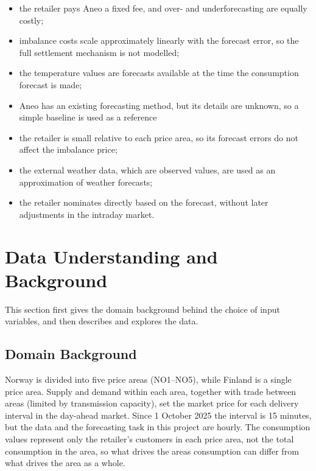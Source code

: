 \documentclass[11pt,a4paper]{article}
\begin{document}
\begin{itemize}[itemsep=0pt, topsep=4pt]
    \item the retailer pays Aneo a fixed fee, and over- and underforecasting are equally costly;
    \item imbalance costs scale approximately linearly with the forecast error, so the full settlement mechanism is not modelled;
    \item the temperature values are forecasts available at the time the consumption forecast is made;
    \item Aneo has an existing forecasting method, but its details are unknown, so a simple baseline is used as a reference
    \item the retailer is small relative to each price area, so its forecast errors do not affect the imbalance price;
    \item the external weather data, which are observed values, are used as an approximation of weather forecasts;
    \item the retailer nominates directly based on the forecast, without later adjustments in the intraday market.
\end{itemize}
\newpage

\section{Data Understanding and Background}
\label{sec:data}

This section first gives the domain background behind the choice of input variables, and then describes and explores the data.

\subsection{Domain Background}

Norway is divided into five price areas (NO1--NO5), while Finland is a single price area. Supply and demand within each area, together with trade between areas (limited by transmission capacity), set the market price for each delivery interval in the day-ahead market. Since 1 October 2025 the interval is 15 minutes, but the data and the forecasting task in this project are hourly. The consumption values represent only the retailer's customers in each price area, not the total consumption in the area, so what drives the areas consumption can differ from what drives the area as a whole.
\end{document}
